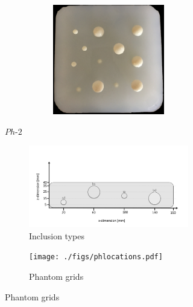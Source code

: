 \documentclass[]{interact}
\theoremstyle{plain}%
\theoremstyle{definition}
\theoremstyle{remark}
\begin{document}
\begin{figure}[]
\begin{subfigure}[b]{0.3\textwidth}
\begin{subfigure}[b]{\textwidth}
\begin{subfigure}[b]{\textwidth}
				\includegraphics[width=\textwidth]{./figs/ph2.jpg}
			\end{subfigure} 
		\end{subfigure}
		\caption{$Ph\text{-}2$}
		\label{ph2}
	\end{subfigure}
	
	\begin{subfigure}[b]{\textwidth}
		\begin{subfigure}[b]{0.6\textwidth}
			\centering
			\includegraphics[width=\textwidth]{./figs/phsidenew.pdf}
			\caption{Inclusion types}
			\label{phantomgrid:description}
		\end{subfigure}
		\begin{subfigure}[b]{0.4\textwidth}
			\centering
			\texttt{[image: ./figs/phlocations.pdf]}
			\caption{Phantom grids}
			\label{phantomgrid:3d}
		\end{subfigure} 
	\end{subfigure}
	\caption{
	}
	\label{robot-set-up}
	
\end{figure}
\end{document}
